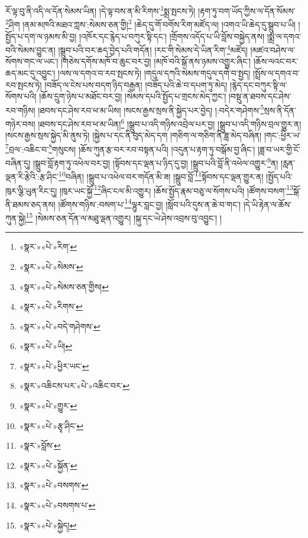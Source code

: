 རོ་ལྟ་བུ་ནི་འདི་ལ་དོན་སེམས་ཡིན། །དེ་ལྟ་བས་ན་མི་རིགས་\footnote{«སྣར་»«པེ་»རིག་}སྨྲ་སྤངས་ཏེ། །རྟག་ཏུ་བག་ཡོད་ཀྱིས་ལ་དོན་སོམས་\footnote{«སྣར་»«པེ་»སེམས་}ཤིག །ནམ་མཁའི་མཐའ་ཀླས་:སེམས་ཅན་གྱི།\footnote{«སྣར་»«པེ་»སེམས་ཅན་གྱིས།} །ཆེད་དུ་གོ་བགོས་རིག་མཛོད་ལ། །འགའ་ཡི་ཆེད་དུ་སྒྲུབ་པ་ཡི། །སྤྱོད་པ་དག་ལ་ཉམས་མི་བྱ། །འཁོར་དང་རྙེད་པ་བཀུར་སྟི་དང་། །གྲོགས་འདོད་པ་ཡི་བློས་བསྐྱེད་ནས། །སྨྲ་ལ་དགའ་བའི་སེམས་བྱུང་ན། །སྒྲུབ་པའི་བར་ཆད་བྱེད་པའི་གདོན། །རང་གི་སེམས་དེ་ཡིན་རིག་\footnote{«སྣར་»«པེ་»རིགས་}མཛོད། །མཛའ་བཤེས་ལ་སོགས་གང་ལ་ཡང་། །གཅེས་དགོས་མཁོ་བ་ཆུང་བར་བྱ། །མཁོ་བའི་སྒོ་ནས་ཉམས་འགྱུར་ཞིང་། །ཆོས་ལའང་བར་ཆད་མང་དུ་འབྱུང་། །ལས་ལ་དགའ་བ་རབ་སྤངས་ཏེ། །གདུལ་དཀའི་སེམས་གདུལ་དགེ་བ་སྤྱད། །སྤྲོས་ལ་དགའ་བ་རབ་སྤངས་ཏེ། །བཟོད་ལ་ངེས་པས་བདག་ཉིད་བརྒྱན། །བཟོད་པའི་ཆེ་བ་དཔག་ཏུ་མེད། །རྙེད་དང་བཀུར་སྟི་ལ་སོགས་པའི། །ཆོས་དྲུག་ཉེས་པ་མཐོང་བར་བྱ། །སེམས་དཔའི་སྤྱོད་པ་གྲངས་མེད་ཀྱང་། །བསྡུ་ན་ཐབས་དང་ཤེས་རབ་གཉིས། །ཐབས་དང་ཤེས་རབ་ཕ་མ་ཡིས། །སངས་རྒྱས་སྲས་ནི་སྐྱེད་པར་བྱེད། །:བདེར་གཤེགས་\footnote{«སྣར་»«པེ་»བདེ་གཤེགས་}སྲས་ནི་དོན་གཉེར་བས། །ཐབས་དང་ཤེས་རབ་ཕ་མ་ཡིན།\footnote{«སྣར་»«པེ་»ཡི།} །སྒྲུབ་པ་འདི་གཉིས་འབྲེལ་པར་བྱ། །སྒྲུབ་པ་འདི་གཉིས་བྲལ་གྱུར་ན། །སངས་རྒྱས་སྲས་སྐྱེད་མི་ནུས་ཏེ། །སྐྱེས་པ་དང་ནི་བུད་མེད་དག །གཅིག་ལ་གཅིག་ནི་ཟླ་མེད་བཞིན། །གང་:ཕྱིར་ཡ་\footnote{«སྣར་»«པེ་»ཕྱིར་ཡང་}བྲལ་:འཆིང་བ་\footnote{«སྣར་»འཆིངས་པར་«པེ་»འཆིང་བར་}གསུངས། །ཆོས་ཀུན་རྩ་བར་རབ་བསྟན་པའི། །འདུན་པ་རྟག་ཏུ་བསྒོམ་བྱ་ཞིང་། །ཟླ་བ་ཡར་གྱི་ངོ་བཞིན་དུ། །སྒྲུབ་བློ་རྟག་ཏུ་འཕེལ་བར་བྱ། །སྟོབས་དང་ལྡན་པ་ཉིད་དུ་བྱ། །སྒྲུབ་པའི་བློ་ནི་འཕེལ་འགྱུར་\footnote{«སྣར་»«པེ་»གྱུར་}ན། །རླན་ལྡན་རི་རྩེའི་:རྩ་ཤིང་\footnote{«སྣར་»«པེ་»རྩྭ་ཤིང་}བཞིན། །སྒྲུབ་པ་འཕེལ་བར་གདོན་མི་ཟ། །སྒྲུབ་བློ་\footnote{«སྣར་»བློས་}སྟོབས་དང་ལྡན་གྱུར་ན། །སྤྱོད་པའི་ཁུར་ལྕི་ཡུན་རིང་དུ། །ཁུར་ཡང་སྐྱོ་\footnote{«སྣར་»«པེ་»སྐྱོན་}ཞིང་ངལ་མི་འགྱུར། །ཆོས་སྤྱོད་རྣམ་བཅུ་ལ་སོགས་པའི། །ཚོགས་བསག་\footnote{«སྣར་»«པེ་»བསགས་}སྒོ་ནི་ཐམས་ཅད་ནས། །ཚོགས་གཉིས་:བསག་པ་\footnote{«སྣར་»«པེ་»བསགས་པ་}ལྷུར་བླང་བྱ། །སློབ་པའི་དུས་ན་ཆེ་བ་གང་། །དེ་ཡི་རྟེན་ལ་ཆོས་ཀུན་སྐྱེ།\footnote{«སྣར་»«པེ་»སྐྱེད།} །སེམས་ཅན་དོན་ལ་མཐུ་ལྡན་འགྱུར། །སྐུ་དང་ཡེ་ཤེས་འབྲས་བུ་འབྱུང་། །
